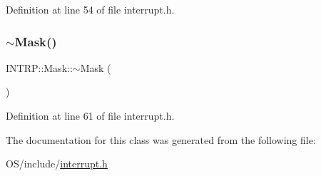 Definition at line 54 of file interrupt.\+h.

\mbox{\label{class_i_n_t_r_p_1_1_mask_a9510ca576c94618168e76d14521c3e6d}} 
\subsubsection{\texorpdfstring{$\sim$\+Mask()}{~Mask()}}
{\footnotesize\ttfamily I\+N\+T\+R\+P\+::\+Mask\+::$\sim$\+Mask (\begin{DoxyParamCaption}{ }\end{DoxyParamCaption})\hspace{0.3cm}{\ttfamily [inline]}}



Definition at line 61 of file interrupt.\+h.



The documentation for this class was generated from the following file\+:\begin{DoxyCompactItemize}
\item 
O\+S/include/\hyperlink{interrupt_8h}{interrupt.\+h}\end{DoxyCompactItemize}
